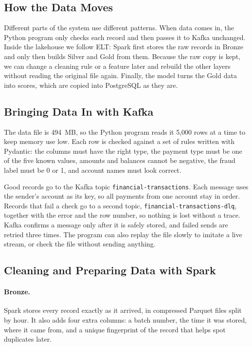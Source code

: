 \documentclass[11pt,a4paper]{article}
\newcommand{\code}[1]{\texttt{#1}}
\begin{document}
\subsection{How the Data Moves}
Different parts of the system use different patterns. When data comes in, the
Python program only checks each record and then passes it to Kafka unchanged.
Inside the lakehouse we follow ELT: Spark first stores the raw records in Bronze
and only then builds Silver and Gold from them. Because the raw copy is kept, we
can change a cleaning rule or a feature later and rebuild the other layers
without reading the original file again. Finally, the model turns the Gold data
into scores, which are copied into PostgreSQL as they are.

\subsection{Bringing Data In with Kafka}
The data file is 494~MB, so the Python program reads it 5,000 rows at a time to
keep memory use low. Each row is checked against a set of rules written with
Pydantic: the columns must have the right type, the payment type must be one of
the five known values, amounts and balances cannot be negative, the fraud label
must be 0 or 1, and account names must look correct.

Good records go to the Kafka topic \code{financial-transactions}. Each message
uses the sender's account as its key, so all payments from one account stay in
order. Records that fail a check go to a second topic,
\code{financial-transactions-dlq}, together with the error and the row number,
so nothing is lost without a trace. Kafka confirms a message only after it is
safely stored, and failed sends are retried three times. The program can also
replay the file slowly to imitate a live stream, or check the file without
sending anything.

\subsection{Cleaning and Preparing Data with Spark}
\paragraph{Bronze.} Spark stores every record exactly as it arrived, in
compressed Parquet files split by hour. It also adds four extra columns: a batch
number, the time it was stored, where it came from, and a unique fingerprint of
the record that helps spot duplicates later.
\end{document}
